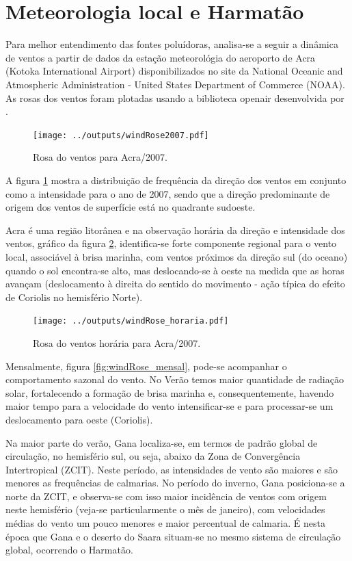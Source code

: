 \section{Meteorologia local e Harmatão}

Para melhor entendimento das fontes poluídoras, analisa-se a seguir a 
dinâmica de ventos a partir de dados da estação meteorológia do 
aeroporto de Acra (Kotoka International Airport) disponibilizados no site da 
National Oceanic and Atmospheric Administration - United States Department of 
Commerce (NOAA). As rosas dos ventos foram plotadas usando a biblioteca 
openair desenvolvida por \citet{carslaw2012}.

\begin{figure}[H]
  \centering
  \texttt{[image: ../outputs/windRose2007.pdf]}
  \caption{Rosa do ventos para Acra/2007. \label{fg:rosaCompleta}}
\end{figure}

A figura \ref{fg:rosaCompleta} mostra a distribuição de frequência da direção 
dos ventos em conjunto como a intensidade para o ano de 2007, sendo que a direção 
predominante de origem dos ventos de superfície está no quadrante sudoeste.

Acra é uma região litorânea e na observação horária da direção e intensidade 
dos ventos, gráfico da figura \ref{fig:windRose_horaria}, identifica-se 
forte componente regional para o vento local, associável à brisa marinha, 
com ventos próximos da direção sul (do oceano) quando o sol encontra-se alto, 
mas deslocando-se 
à oeste na medida que as horas avançam (deslocamento à direita do sentido do 
movimento - ação típica do efeito de Coriolis no hemisfério Norte).

\begin{figure}[H]
  \centering
  \texttt{[image: ../outputs/windRose\_horaria.pdf]}
  \caption{Rosa do ventos horária para Acra/2007. \label{fig:windRose_horaria}}
\end{figure}

Mensalmente, figura \ref{fig:windRose_mensal}, pode-se acompanhar o 
comportamento sazonal do vento. No Verão temos maior quantidade de radiação 
solar, fortalecendo a formação de brisa marinha e, consequentemente, havendo 
maior tempo para a velocidade do vento intensificar-se e para processar-se um 
deslocamento para oeste (Coriolis). 

Na maior parte do verão, Gana localiza-se, em termos de padrão global de 
circulação, no hemisfério sul, ou seja, abaixo da Zona de Convergência 
Intertropical (ZCIT). Neste período, as intensidades de vento são maiores e 
são menores as frequências de calmarias. No período do inverno, Gana 
posiciona-se a norte da ZCIT, e observa-se com isso maior incidência de 
ventos com origem neste hemisfério (veja-se particularmente o mês 
de janeiro), 
com velocidades médias do vento um pouco menores e maior percentual
de calmaria. É nesta época que Gana e o deserto do Saara situam-se no mesmo 
sistema de circulação global, ocorrendo o Harmatão. 

